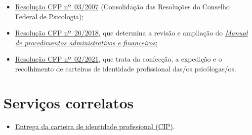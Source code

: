 \begin{itemize}
	\item
	\href{https://atosoficiais.com.br/cfp/resolucao-administrativa-financeira-n-3-2007-institui-a-consolidacao-das-resolucoes-do-conselho-federal-de-psicologia?origin=instituicao&q=resolu\%C3\%A7\%C3\%A3o\%203/2007}{Resolução	CFP nº~03/2007} (Consolidação das Resoluções do Conselho Federal de
	Psicologia);
	\item
	\href{https://transparencia.cfp.org.br/wp-content/uploads/sites/7/2020/05/Manual-de-Procedimentos-Administrativos-e-Financeiro-CFP-RES-20.2018.pdf}{\href{https://atosoficiais.com.br/cfp/resolucao-administrativa-financeira-n-20-2018-altera-o-manual-de-procedimentos-administrativo-e-financeiro-do-sistema-conselhos-de-psicologia-anexo-da-resolucao-cfp-n-202018-a-resolucao-cfp-n-03-2007-a-resolucao-cfp-n-16-2019-e-da-outras-providencias}{Resolução CFP nº~20/2018}}, que determina a revisão e ampliação do \href{https://transparencia.cfp.org.br/wp-content/uploads/sites/7/2020/05/Manual-de-Procedimentos-Administrativos-e-Financeiro-CFP-RES-20.2018.pdf}{\emph{Manual de procedimentos administrativos e financeiros}};
	\item
	\href{https://atosoficiais.com.br/cfp/resolucao-administrativa-financeira-n-2-2021-dispoe-sobre-a-confeccao-a-expedicao-e-o-recolhimento-de-carteiras-de-identidade-profissional-das-os-psicologas-os-revoga-o-capitulo-vi-da-resolucao-cfp-no-03-2007-os-1o-2o-4o-5o-do-art-2o-da-resolucao-cfp-no-02-2007-1o-4o-5o-do-art-2o-e-1o-do-art-4o-da-resolucao-cfp-no-01-1984-e-da-outras-providencias}{Resolução
		CFP nº~02/2021}, que trata da confecção, a expedição e o recolhimento de carteiras de identidade profissional das/os psicólogas/os.
\end{itemize}

\section{Serviços correlatos}

\begin{itemize}
	\item
	\hyperref[chap:pf-cip]{Entrega da carteira de identidade profissional (CIP)}.
\end{itemize}

\sumario